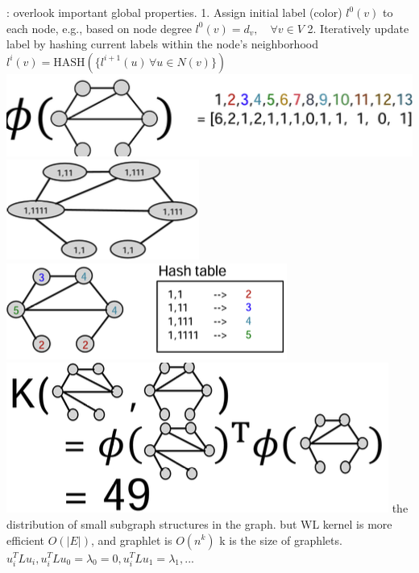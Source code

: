: overlook important global properties.
1. Assign initial label (color) \( l^0(v) \) to each node, e.g., based on node degree 
\( l^0(v) = d_v, \quad \forall v \in V \)
2. Iteratively update label by hashing current labels within the node’s neighborhood 
\( l^i(v) = \text{HASH}\left(\{ l^{i+1}(u) \, \forall u \in N(v) \}\right) \)
\includegraphics[height=0.025\textwidth]{figs/l2-8.png}
\includegraphics[height=0.02\textwidth]{figs/l2-6.png}
\includegraphics[height=0.025\textwidth]{figs/l2-7.png}
\includegraphics[height=0.025\textwidth]{figs/l2-9.png}
 the distribution of small subgraph structures in the graph. but WL kernel is more efficient $O(\left|E\right|)$, and graphlet is $O(n^k)$ k is the size of graphlets.
 \(u_i^TLu_i, u_i^TLu_0 = \lambda_0=0, u_i^TLu_1=\lambda_1, ...\)

